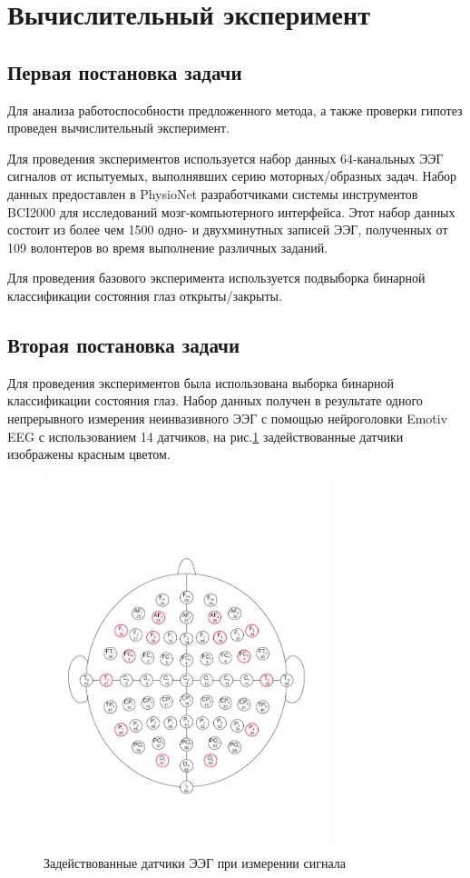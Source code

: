 \documentclass[a4paper, 12pt]{extarticle}
\begin{document}
\section{Вычислительный эксперимент}
\subsection{Первая постановка задачи}
Для анализа работоспособности предложенного метода, а также проверки гипотез
проведен вычислительный эксперимент.

Для проведения экспериментов используется набор данных \citep{schalk2004bci2000} 64-канальных ЭЭГ сигналов от испытуемых, 
выполнявших серию моторных/образных задач. 
Набор данных предоставлен в PhysioNet разработчиками системы инструментов BCI2000 
для исследований мозг-компьютерного интерфейса. Этот набор данных состоит из более 
чем 1500 одно- и двухминутных записей ЭЭГ, полученных от 109 волонтеров во время выполнение различных заданий. 
 
Для проведения базового эксперимента используется подвыборка бинарной классификации состояния глаз открыты/закрыты.




\subsection{Вторая постановка задачи}
Для проведения экспериментов была использована выборка бинарной классификации состояния глаз.
Набор данных получен в результате одного непрерывного измерения неинвазивного ЭЭГ с 
помощью нейроголовки Emotiv EEG с использованием 14 датчиков, на рис.\ref{fig:1} задействованные датчики
изображены красным цветом. 
\begin{figure}[h]
	\centering
	\includegraphics[width=0.75\textwidth]{64_channel_sharbrough.pdf}
	\caption{Задействованные датчики ЭЭГ при измерении сигнала}
	\label{fig:1}
\end{figure}
\end{document}
